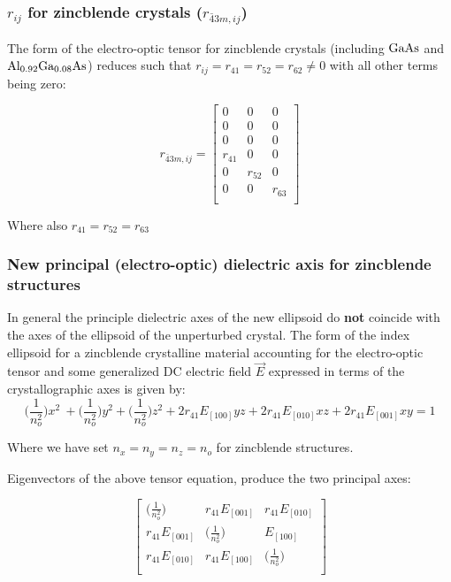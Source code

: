 
\subsubsection{$r_{ij}$ for zincblende crystals ($r_{\bar{4}3m, ij}$)}

The form of the electro-optic tensor for zincblende crystals (including $\mathrm{GaAs}$ and $\mathrm{Al_{0.92}Ga_{0.08}As}$) reduces such that $r_{ij} = r_{41} = r_{52} = r_{62} \neq 0$ with all other terms being zero:

\begin{equation}
r_{\bar{4}3m,ij} =
 \left[ {\begin{array}{ccc}
  0 & 0 & 0\\
  0 & 0 & 0\\
  0 & 0 & 0\\
  r_{41} & 0 & 0\\
  0 & r_{52} & 0\\
  0 & 0 & r_{63}\\
 \end{array}} \right]
\end{equation}

\noindent Where also $r_{41} = r_{52} = r_{63}$

\subsubsection{New principal (electro-optic) dielectric axis for zincblende structures}
In general the principle dielectric axes of the new ellipsoid do \textbf{not} coincide with the axes of the ellipsoid of the unperturbed crystal. The form of the index ellipsoid for a zincblende crystalline material accounting for the electro-optic tensor and some generalized DC electric field $\vec{E}$ expressed in terms of the crystallographic axes is given by:
\begin{equation}\label{eq:zindicatrix}
\bigg(\frac{1}{n_o^2} \bigg) x^2\ + \bigg(\frac{1}{n_o^2} \bigg) y^2 + \bigg(\frac{1}{n_o^2} \bigg) z^2  + 2r_{41} E_{[100]} yz + 2r_{41} E_{[010]} xz + 2r_{41}E_{[001]} xy= 1
\end{equation}

\noindent Where we have set $n_x = n_y = n_z = n_o$ for zincblende structures.

\noindent Eigenvectors of the above tensor equation, produce the two principal axes:	

\begin{equation}
 \left[ {\begin{array}{ccc}
   \big( \frac{1}{n_o ^2} \big)& r_{41}E_{[001]} & r_{41} E_{[010]}\\
   r_{41}E_{[001]} & \big( \frac{1}{n_o ^2} \big) &  E_{[100]}\\
   r_{41} E_{[010]} & r_{41} E_{[100]} & \big( \frac{1}{n_o ^2} \big)\\
  \end{array}} \right]
\end{equation}

